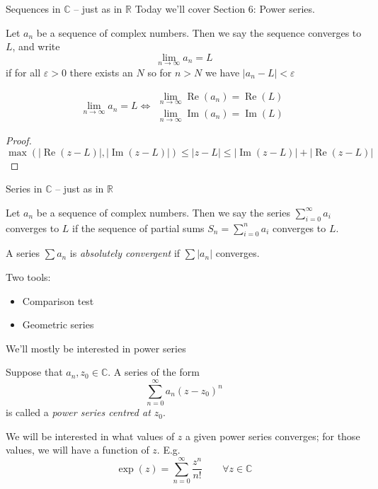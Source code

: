 \documentclass{beamer}
\newcommand{\C}{\mathbb{C}}
\newcommand{\R}{\mathbb{R}}
\DeclareMathOperator{\Real}{Re}
\DeclareMathOperator{\Imag}{Im}
\begin{document}
\begin{frame}{Sequences in $\C$ -- just as in $\R$}
Today we'll cover Section 6: Power series.

  \begin{definition}
Let $a_n$ be a sequence of complex numbers.  Then we say the sequence converges to $L$, and write $$\lim_{n\to\infty} a_n=L$$ if for all $\varepsilon>0$ there exists an $N$ so for $n>N$ we have $|a_n-L|<\varepsilon$
\end{definition}    
\begin{lemma} 
$$\lim_{n\to\infty} a_n=L \iff \begin{array}{c}\lim_{n\to\infty} \Real(a_n)=\Real(L) \\ \lim_{n\to\infty} \Imag(a_n)=\Imag(L)\end{array}$$
\end{lemma}
\begin{proof}
$$\max\left(|\Real(z-L)|, |\Imag(z-L)|\right)\leq |z-L|\leq|\Imag(z-L)|+|\Real(z-L )|$$
\end{proof}
\end{frame}

\begin{frame}{Series in $\C$ -- just as in $\R$}

\begin{definition}
Let $a_n$ be a sequence of complex numbers.  Then we say the series $\sum_{i=0}^\infty a_i$ converges to $L$ if the sequence of partial sums $S_n=\sum_{i=0}^n a_i$ converges to $L$.    
\end{definition}    

\begin{definition}
    A series $\sum a_n$ is \emph{absolutely convergent} if $\sum |a_n|$ converges. 
\end{definition}
\begin{block}{Two tools:}
\begin{itemize}
\item Comparison test
\item Geometric series
\end{itemize}
\end{block}


    
\end{frame}

\begin{frame}{We'll mostly be interested in power series}
\begin{definition} Suppose that $a_n, z_0\in \C$. A series of the form
$$\sum_{n=0}^\infty a_n (z-z_0)^n$$
is called a \emph{power series centred at $z_0$}.
\end{definition}
We will be interested in what values of $z$ a given power series converges; for those values, we will have a function of $z$.  E.g.
$$\exp(z)=\sum_{n=0}^\infty \frac{z^n}{n!}\quad\quad\forall z\in\C$$
\end{frame}
\end{document}
